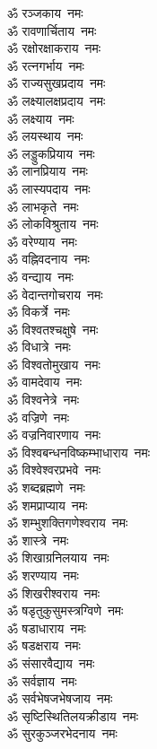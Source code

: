 \begin{multicols}{2}
\begin{flushleft}
ॐ रञ्जकाय~नमः\\
ॐ रावणार्चिताय~नमः\hfill{}\\
ॐ रक्षोरक्षाकराय~नमः\\
ॐ रत्नगर्भाय~नमः\\
ॐ राज्यसुखप्रदाय~नमः\\
ॐ लक्ष्यालक्षप्रदाय~नमः\\
ॐ लक्ष्याय~नमः\\
ॐ लयस्थाय~नमः\\
ॐ लड्डुकप्रियाय~नमः\\
ॐ लानप्रियाय~नमः\\
ॐ लास्यपदाय~नमः\\
ॐ लाभकृते~नमः\hfill{}\\
ॐ लोकविश्रुताय~नमः\\
ॐ वरेण्याय~नमः\\
ॐ वह्निवदनाय~नमः\\
ॐ वन्द्याय~नमः\\
ॐ वेदान्तगोचराय~नमः\\
ॐ विकर्त्रे~नमः\\
ॐ विश्वतश्चक्षुषे~नमः\\
ॐ विधात्रे~नमः\\
ॐ विश्वतोमुखाय~नमः\\
ॐ वामदेवाय~नमः\hfill{}\\
ॐ विश्वनेत्रे~नमः\\
ॐ वज्रिणे~नमः\\
ॐ वज्रनिवारणाय~नमः\\
ॐ विश्वबन्धनविष्कम्भाधाराय~नमः\\
ॐ विश्वेश्वरप्रभवे~नमः\\
ॐ शब्दब्रह्मणे~नमः\\
ॐ शमप्राप्याय~नमः\\
ॐ शम्भुशक्तिगणेश्वराय~नमः\\
ॐ शास्त्रे~नमः\\
ॐ शिखाग्रनिलयाय~नमः\hfill{}\\
ॐ शरण्याय~नमः\\
ॐ शिखरीश्वराय~नमः\\
ॐ षडृतुकुसुमस्त्रग्विणे~नमः\\
ॐ षडाधाराय~नमः\\
ॐ षडक्षराय~नमः\\
ॐ संसारवैद्याय~नमः\\
ॐ सर्वज्ञाय~नमः\\
ॐ सर्वभेषजभेषजाय~नमः\\
ॐ सृष्टिस्थितिलयक्रीडाय~नमः\\
ॐ सुरकुञ्जरभेदनाय~नमः\hfill{}\\

\end{flushleft}
\end{multicols}
